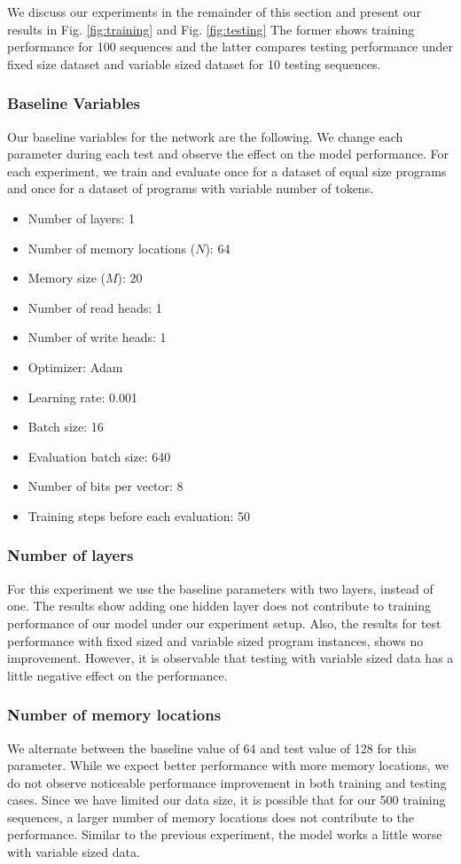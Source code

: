 \documentclass[acmsmall]{acmart}
\begin{document}
We discuss our experiments in the remainder of this section and present our results in Fig. \ref{fig:training} and Fig. \ref{fig:testing} The former shows training performance for 100 sequences and the latter compares testing performance under fixed size dataset and variable sized dataset for 10 testing sequences.

\subsubsection{Baseline Variables}
Our baseline variables for the network are the following. We change each parameter during each test and observe the effect on the model performance. For each experiment, we train and evaluate once for a dataset of equal size programs and once for a dataset of programs with variable number of tokens.

\begin{itemize}
	\item Number of layers: 1
	\item Number of memory locations ($N$): 64
	\item Memory size ($M$): 20
	\item Number of read heads: 1
	\item Number of write heads: 1
	\item Optimizer: Adam
	\item Learning rate: 0.001
	\item Batch size: 16
	\item Evaluation batch size: 640
	\item Number of bits per vector: 8
	\item Training steps before each evaluation: 50		
\end{itemize}

\subsubsection{Number of layers}
For this experiment we use the baseline parameters with two layers, instead of one. The results show adding one hidden layer does not contribute to training performance of our model under our experiment setup. Also, the results for test performance with fixed sized and variable sized program instances, shows no improvement. However, it is observable that testing with variable sized data has a little negative effect on the performance.

\subsubsection{Number of memory locations}
We alternate between the baseline value of 64 and test value of 128 for this parameter. While we expect better performance with more memory locations, we do not observe noticeable performance improvement in both training and testing cases. Since we have limited our data size, it is possible that for our 500 training sequences, a larger number of memory locations does not contribute to the performance. Similar to the previous experiment, the model works a little worse with variable sized data.
\end{document}
